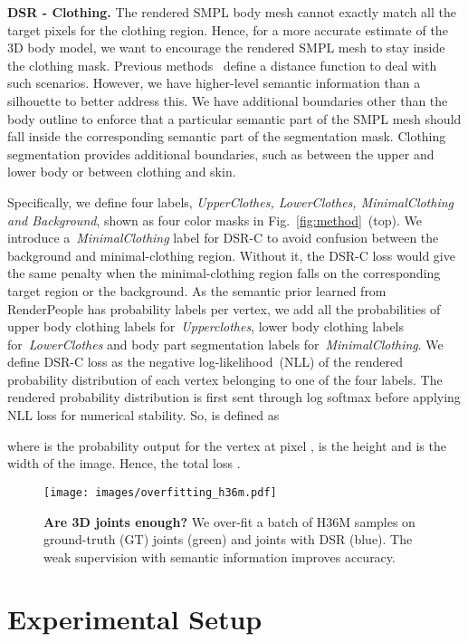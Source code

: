 \documentclass[10pt,twocolumn,letterpaper]{article}
\newcommand{\modelname}[0]{DSR\xspace}
\begin{document}
\textbf{DSR - Clothing.} The rendered SMPL body mesh cannot exactly match all the target pixels for the clothing region. Hence, for a more accurate estimate of the 3D body model, we want to encourage the rendered SMPL mesh to stay inside the clothing mask. Previous methods~\cite{balan_eccv} define a distance function to deal with such scenarios. However, we have higher-level semantic information than a silhouette to better address this. We have additional boundaries other than the body outline to enforce that a particular semantic part of the SMPL mesh should fall inside the corresponding semantic part of the segmentation mask. Clothing segmentation provides additional boundaries, such as between the upper and lower body or between clothing and skin.

Specifically, we define four labels, \emph{UpperClothes, LowerClothes, MinimalClothing and Background}, shown as four color masks in Fig.~\ref{fig:method}~(top). We  introduce a~\emph{MinimalClothing} label for \modelname-C to avoid  confusion between the background and minimal-clothing region.  Without it, the \modelname-C loss would give the same penalty when the minimal-clothing region falls on the corresponding target region or the background. As the semantic prior learned from RenderPeople has  probability labels per vertex, we add all the probabilities of upper body clothing labels for~\emph{Upperclothes}, lower body clothing labels for~\emph{LowerClothes} and body part segmentation labels for~\emph{MinimalClothing}. We define \modelname-C loss as the negative log-likelihood~(NLL) of the rendered probability distribution of each vertex belonging to one of the four labels. The rendered probability distribution is first sent through log softmax before applying NLL loss for numerical stability. So,  is defined as 

where  is the probability output for the vertex at pixel ,  is the height and  is the width of the image. Hence, the total loss . \begin{figure}[t!]
    \centerline{\texttt{[image: images/overfitting\_h36m.pdf]}}
    \vspace{-0.1in}
    \caption{\textbf{Are 3D joints enough?} We over-fit a batch of H36M samples on ground-truth (GT) joints (green) and joints with DSR (blue). The weak supervision with semantic information improves accuracy.}
    \label{fig:overfitting_h36m}
\end{figure}

\section{Experimental Setup}
\end{document}
